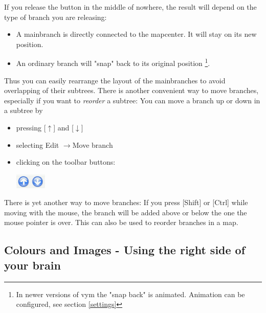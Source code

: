 \documentclass[12pt,a4paper]{article}
\newcommand{\ra}{$\longrightarrow$}
\newcommand{\ua}{$\uparrow$}
\newcommand{\da}{$\downarrow$}
\newcommand{\key}[1]{[#1]}
\begin{document}
If you release the button in the middle of nowhere, the result will
depend on the type of branch you are releasing:
\begin{itemize}
    \item A mainbranch is directly connected to the mapcenter.
        It will stay on its new position.
    \item An ordinary branch will "snap" back to its original position
    \footnote{In newer versions of vym the "snap back" is animated.
    Animation can be configured, see section \ref{settings}}. 
\end{itemize}
Thus you can easily rearrange the layout of the mainbranches to avoid
overlapping of their subtrees.  There is another convenient way to move
branches, especially if you want to {\em reorder} a subtree: You can
move a branch up or down in a subtree by
\begin{itemize}
    \item pressing \key{\ua} and \key {\da}
    \item selecting Edit \ra Move branch
    \item clicking on the toolbar buttons:
        \begin{center}
            \includegraphics[width=1.5cm]{images/move-buttons.png}
        \end{center}    
\end{itemize}
There is yet another way to move branches: If you press \key{Shift} or
\key{Ctrl} while moving with the mouse, the branch will be added above
or below the one the mouse pointer is over. This can also be used to
reorder branches in a map.

\subsection{Colours and Images - Using the right side of your brain}
\end{document}
